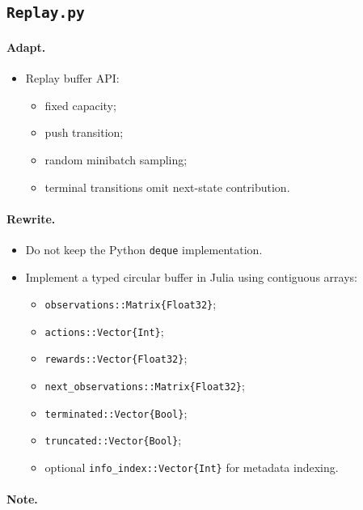 \documentclass[11pt]{article}
\begin{document}
\subsection{\texttt{Replay.py}}

\paragraph{Adapt.}

\begin{itemize}
\item Replay buffer API:
\begin{itemize}
\item fixed capacity;
\item push transition;
\item random minibatch sampling;
\item terminal transitions omit next-state contribution.
\end{itemize}
\end{itemize}

\paragraph{Rewrite.}

\begin{itemize}
\item Do not keep the Python \texttt{deque} implementation.
\item Implement a typed circular buffer in Julia using contiguous arrays:
\begin{itemize}
\item \texttt{observations::Matrix\{Float32\}};
\item \texttt{actions::Vector\{Int\}};
\item \texttt{rewards::Vector\{Float32\}};
\item \texttt{next\_observations::Matrix\{Float32\}};
\item \texttt{terminated::Vector\{Bool\}};
\item \texttt{truncated::Vector\{Bool\}};
\item optional \texttt{info\_index::Vector\{Int\}} for metadata indexing.
\end{itemize}
\end{itemize}

\paragraph{Note.}
\end{document}
